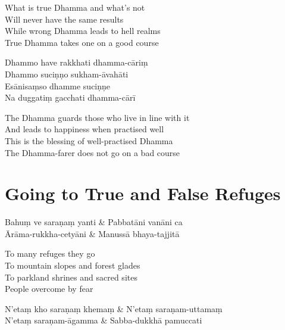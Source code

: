 \begin{english}
  What is true Dhamma and what's not\\
  Will never have the same results\\
  While wrong Dhamma leads to hell realms\\
  True Dhamma takes one on a good course
\end{english}

\begin{paritta}
  Dhammo have rakkhati dhamma-cāriṃ\\
  Dhammo suciṇṇo sukham-āvahāti\\
  Esānisaṃso dhamme suciṇṇe\\
  Na duggatiṃ gacchati dhamma-cārī
\end{paritta}

\clearpage

\begin{english}
  The Dhamma guards those who live in line with it\\
  And leads to happiness when practised well\\
  This is the blessing of well-practised Dhamma\\
  The Dhamma-farer does not go on a bad course
\end{english}


\clearpage

\section{Going to True and False Refuges}

\begin{twochants}
Bahuṃ ve saraṇaṃ yanti & Pabbatāni vanāni ca\\
Ārāma-rukkha-cetyāni & Manussā bhaya-tajjitā\\
\end{twochants}

\begin{english}
  To many refuges they go\\
  To mountain slopes and forest glades\\
  To parkland shrines and sacred sites\\
  People overcome by fear
\end{english}

\begin{twochants}
N'etaṃ kho saraṇaṃ khemaṃ & N'etaṃ saraṇam-uttamaṃ\\
N'etaṃ saraṇam-āgamma & Sabba-dukkhā pamuccati\\
\end{twochants}

